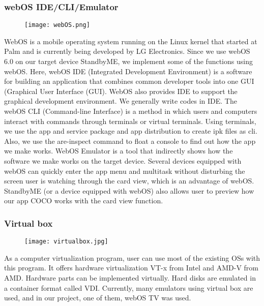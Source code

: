 \documentclass[conference]{IEEEtran}
\begin{document}
\subsubsection{webOS IDE/CLI/Emulator}
\par \begin{figure}[H]
\texttt{[image: webOS.png]}
\centering
\end{figure}
WebOS is a mobile operating system running on the Linux kernel that started at Palm and is currently being developed by LG Electronics. Since we use webOS 6.0 on our target device StandbyME, we implement some of the functions using webOS. 
Here, webOS IDE (Integrated Development Environment) is a software for building an application that combines common developer tools into one GUI (Graphical User Interface (GUI). WebOS also provides IDE to support the graphical development environment. We generally write codes in IDE.
The webOS CLI (Command-line Interface) is a method in which users and computers interact with commands through terminals or virtual terminals. Using terminals, we use the app and service package and app distribution to create ipk files as cli. Also, we use the are-inspect command to float a console to find out how the app we make works.
WebOS Emulator is a tool that indirectly shows how the software we make works on the target device. Several devices equipped with webOS can quickly enter the app menu and multitask without disturbing the screen user is watching through the card view, which is an advantage of webOS. StandbyME (or a device equipped with webOS) also allows user to preview how our app COCO works with the card view function.
\vspace{1\baselineskip}
\subsubsection{Virtual box}
\par \begin{figure}[H]
\texttt{[image: virtualbox.jpg]}
\centering
\end{figure}
As a computer virtualization program, user can use most of the existing OSs with this program. It offers hardware virtualization VT-x from Intel and AMD-V from AMD. Hardware parts can be implemented virtually. Hard disks are emulated in a container format called VDI. Currently, many emulators using virtual box are used, and in our project, one of them, webOS TV was used.
\vspace{1\baselineskip}
\end{document}
